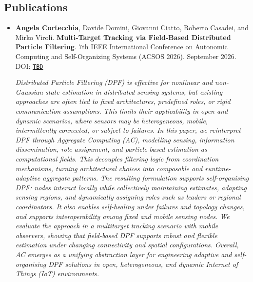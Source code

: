 \documentclass[11pt]{scrartcl}
\newcommand{\pubentry}[6]{%
  \item
  #1.
  \textbf{#2}.
  #3.
  #4.
  \if\relax\detokenize{#6}\relax\else
    \\ DOI: \href{https://doi.org/#6}{\texttt{#6}}%
  \fi

  \begin{sloppypar}
    \vspace{8pt}
    \textit{#5}
    \vspace{8pt}
  \end{sloppypar}
}
\newenvironment{publications}
  {%
    \subsection*{Publications}
    \begin{itemize}
  }
  {%
    \end{itemize}
  }
\begin{document}
\begin{publications}
  \pubentry
  {\textbf{Angela Cortecchia}, Davide Domini, Giovanni Ciatto, Roberto Casadei, and Mirko Viroli}
  {Multi-Target Tracking via Field-Based Distributed Particle Filtering}
  {7th IEEE International Conference on Autonomic Computing and Self-Organizing Systems (ACSOS 2026)}
  {September 2026}
  {Distributed Particle Filtering (DPF) is effective for nonlinear and non-Gaussian state estimation in distributed sensing systems, but existing approaches are often tied to fixed architectures, predefined roles, or rigid communication assumptions. This limits their applicability in open and dynamic scenarios, where sensors may be heterogeneous, mobile, intermittently connected, or subject to failures. In this paper, we reinterpret DPF through Aggregate Computing (AC), modelling sensing, information dissemination, role assignment, and particle-based estimation as computational fields. This decouples filtering logic from coordination mechanisms, turning architectural choices into composable and runtime-adaptive aggregate patterns. The resulting formulation supports self-organising DPF: nodes interact locally while collectively maintaining estimates, adapting sensing regions, and dynamically assigning roles such as leaders or regional coordinators. It also enables self-healing under failures and topology changes, and supports interoperability among fixed and mobile sensing nodes. We evaluate the approach in a multitarget tracking scenario with mobile observers, showing that field-based DPF supports robust and flexible estimation under changing connectivity and spatial configurations. Overall, AC emerges as a unifying abstraction layer for engineering adaptive and self-organising DPF solutions in open, heterogeneous, and dynamic Internet of Things (IoT) environments.}
  {TBD}


\end{publications}
\end{document}
